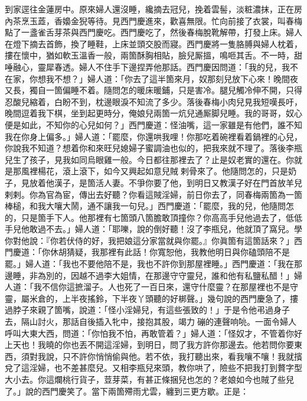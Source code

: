到家逕往金蓮房中。原來婦人還沒睡，纔摘去冠兒，挽着雲髻，淡粧濃抹，正在房內茶烹玉蕋，香嬝金猊等待。見西門慶進來，歡喜無限。忙向前接了衣裳，叫春梅點了一盞雀舌芽茶與西門慶吃。西門慶吃了，然後春梅脫靴解帶，打發上床。婦人在燈下摘去首飾，換了睡鞋，上床並頭交股而寢。西門慶將一隻胳膊與婦人枕着，摟在懷中，猶如軟玉溫香一般，兩箇酥胸相貼，臉兒厮搵，鳴咂其舌。不一時，甜唾融心，靈犀春透。婦人不住手下邊捏弄他那話。西門慶因問道：「我的兒，我不在家，你想我不想？」婦人道：「你去了這半箇來月，奴那刻兒放下心來！晚間夜又長，獨自一箇偏睡不着。隨問怎的暖床暖鋪，只是害冷。{}{}腿兒觸冷伸不開，只得忍酸兒縮着，白盼不到，枕邊眼淚不知流了多少。落後春梅小肉兒見我短嘆長吁，晚間逗着我下棋，坐到起更時分，俺娘兒兩箇一炕兒通厮脚兒睡。我的哥哥，奴心便是如此，不知你的心兒如何？」西門慶道：怪油嘴，這一家雖是有他們，誰不知我在你身上偏多。」{}婦人道：「罷麼，你還哄我哩！你那吃着碗裡看着鍋裡的心兒，你說我不知道？想着你和來旺兒媳婦子蜜調油也似的，把我來就不理了。落後李瓶兒生了孩子，見我如同烏眼雞一般。今日都往那裡去了？止是奴老實的還在。{}你就是那風裡楊花，滾上滾下，如今又興起如意兒賊𢱉剌骨來了。他隨問怎的，只是奶子，見放着他漢子，是箇活人妻。不爭你要了他，到明日又教漢子好在門首放羊兒剌剌。你為官為宦，傳出去好聽？你看這賊淫婦，前日你去了，同春梅兩箇為一箇棒槌，和我大嚷大鬧，通不讓我一句兒。」西門慶道：「罷麼，我的兒，他隨問怎的，只是箇手下人。他那裡有七箇頭八箇膽敢頂撞你？你高高手兒他過去了，低低手兒他敢過不去。」{}婦人道：「耶嚛，說的倒好聽！沒了李瓶兒，他就頂了窩兒。學你對他說：『你若伏侍的好，我把娘這分家當就與你罷。』你眞箇有這箇話來？」{}西門慶道：「你休胡猜疑，我那裡有此話！你寬恕他，我教他明日與你磕頭陪不是罷。」婦人道：「我也不要他陪不是，我也不許你到那屋裡睡。」西門慶道：「我在那邊睡，非為別的，因越不過李大姐情，在那邊守守靈兒，誰和他有私鹽私醋！」婦人道：「我不信你這摭溜子。人也死了一百日來，還守什麼靈？在那屋裡也不是守靈，屬米倉的，上半夜搖鈴，下半夜丫頭聽的好梆聲。」幾句說的西門慶急了，摟過脖子來親了箇嘴，說道：「怪小淫婦兒，有這些張致的！」于是令他弔過身子去，隔山討火，那話自後插入牝中，接抱其股，竭力𢵞磞的連聲响喨。一面令婦人呼叫大東大西，問道：「你怕我不怕，再敢管着？」婦人道：「怪奴才，不管着你好上天也！我曉的你也丟不開這淫婦，到明日，問了我方許你那邊去。他若問你要東西，須對我說，只不許你悄悄偷與他。若不依，我打聽出來，看我嚷不嚷！我就擯兌了這淫婦，也不差甚麼兒。又相李瓶兒來頭，教你哄了，險些不把我打到贅字型大小去。{}你這爛桃行貨子，荳芽菜，有甚正條捆兒也怎的？老娘如今也賊了些兒了。」{}說的西門慶笑了。當下兩箇殢雨尤雲，纏到三更方歇。正是：

